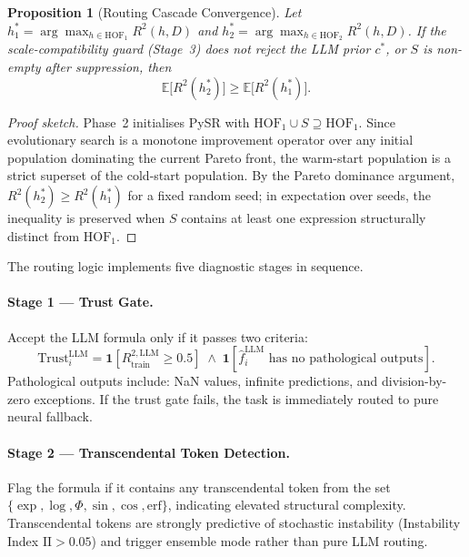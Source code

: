 \documentclass[twoside,11pt]{article}
\newcommand{\II}{\mathrm{II}}
\newtheorem{proposition}[theorem]{Proposition}
\begin{document}
\begin{proposition}[Routing Cascade Convergence]
\label{prop:convergence}
Let $h^*_1 = \arg\max_{h \in \mathrm{HOF}_1} R^2(h, D)$ and
$h^*_2 = \arg\max_{h \in \mathrm{HOF}_2} R^2(h, D)$.
If the scale-compatibility guard (Stage~3) does not reject the LLM
prior $c^*$, or $S$ is non-empty after suppression, then
$$\mathbb{E}\bigl[R^2(h^*_2)\bigr] \geq \mathbb{E}\bigl[R^2(h^*_1)\bigr].$$
\end{proposition}

\begin{proof}[Proof sketch]
Phase~2 initialises PySR with $\mathrm{HOF}_1 \cup S \supseteq \mathrm{HOF}_1$.
Since evolutionary search is a monotone improvement operator over any
initial population dominating the current Pareto front, the warm-start
population is a strict superset of the cold-start population.
By the Pareto dominance argument, $R^2(h^*_2) \geq R^2(h^*_1)$
for a fixed random seed; in expectation over seeds, the inequality is
preserved when $S$ contains at least one expression structurally
distinct from $\mathrm{HOF}_1$.
\end{proof}

The routing logic implements five diagnostic stages in sequence.

\paragraph{Stage 1 --- Trust Gate.}
Accept the LLM formula only if it passes two criteria:
\begin{equation}
  \text{Trust}_i^{\mathrm{LLM}} = \mathbf{1}\!\left[{R^{2,\mathrm{LLM}}_{\mathrm{train}}} \ge 0.5\right]
  \;\land\; \mathbf{1}\!\left[\hat{f}^{\mathrm{LLM}}_i \text{ has no pathological outputs}\right].
  \label{eq:trust}
\end{equation}
Pathological outputs include: NaN values, infinite predictions, and division-by-zero
exceptions.  If the trust gate fails, the task is immediately routed to pure neural
fallback.

\paragraph{Stage 2 --- Transcendental Token Detection.}
Flag the formula if it contains any transcendental token from the set
$\{\exp, \log, \Phi, \sin, \cos, \mathrm{erf}\}$, indicating elevated structural
complexity.  Transcendental tokens are strongly predictive of stochastic instability
(Instability Index $\II > 0.05$) and trigger ensemble mode rather than pure LLM
routing.
\end{document}
